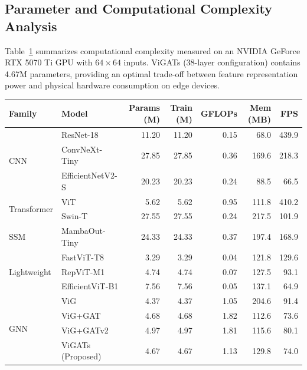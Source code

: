 \documentclass[]{interact}
\theoremstyle{plain}
\theoremstyle{definition}
\theoremstyle{remark}
\begin{document}
\subsection{Parameter and Computational Complexity Analysis}

Table~\ref{tab:model_complexity} summarizes computational complexity measured on an NVIDIA GeForce RTX 5070 Ti GPU with $64 \times 64$ inputs. ViGATs (38-layer configuration) contains 4.67M parameters, providing an optimal trade-off between feature representation power and physical hardware consumption on edge devices.

\begin{table}[H]
\small
\setlength{\tabcolsep}{3pt}
{\begin{tabular}{llrrrrr} \toprule
\textbf{Family} & \textbf{Model} & \textbf{Params (M)} & \textbf{Train (M)} & \textbf{GFLOPs} & \textbf{Mem (MB)} & \textbf{FPS} \\ \midrule
\multirow{3}{*}{CNN}
 & ResNet-18 \citep{he2016deep}           & 11.20 & 11.20 & \textcolor{secondorange}{0.15} & \textcolor{bestblue}{68.0}  & \textcolor{bestblue}{439.9} \\
 & ConvNeXt-Tiny \citep{liu2022convnext}  & 27.85 & 27.85 & 0.36 & 169.6 & 218.3 \\
 & EfficientNetV2-S \citep{tan2021efficientnetv2} & 20.23 & 20.23 & 0.24 & \textcolor{secondorange}{88.5} & 66.5 \\ \midrule
\multirow{2}{*}{Transformer}
 & ViT \citep{dosovitskiy2020image}       & 5.62  & 5.62  & 0.95 & 111.8 & \textcolor{secondorange}{410.2} \\
 & Swin-T \citep{liu2021swin}             & 27.55 & 27.55 & 0.24 & 217.5 & 101.9 \\ \midrule
SSM
 & MambaOut-Tiny \citep{yu2024mambaout}   & 24.33 & 24.33 & 0.37 & 197.4 & 168.9 \\ \midrule
\multirow{3}{*}{Lightweight}
 & FastViT-T8 \citep{vasu2023fastvit}     & \textcolor{bestblue}{3.29}  & \textcolor{bestblue}{3.29}  & \textcolor{bestblue}{0.04} & 121.8 & 129.6 \\
 & RepViT-M1 \citep{wang2024repvit}       & 4.74  & 4.74  & 0.07 & 127.5 & 93.1 \\
 & EfficientViT-B1 \citep{cai2023efficientvit} & 7.56 & 7.56 & 0.05 & 137.1 & 64.9 \\ \midrule
\multirow{4}{*}{GNN}
 & ViG \citep{han2022vision}              & \textcolor{secondorange}{4.37}  & \textcolor{secondorange}{4.37}  & 1.05 & 204.6 & 91.4 \\
 & ViG+GAT \citep{velickovic2018graph}    & 4.68  & 4.68  & 1.82 & 112.6 & 73.6 \\
 & ViG+GATv2 \citep{brody2022gat}         & 4.97  & 4.97  & 1.81 & 115.6 & 80.1 \\
 & ViGATs (Proposed)             & 4.67  & 4.67  & 1.13 & 129.8 & 74.0 \\ \bottomrule
\end{tabular}}
\label{tab:model_complexity}
\end{table}
\end{document}
